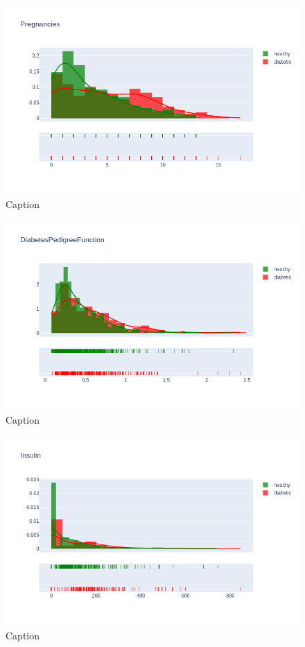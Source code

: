 \documentclass[12pt]{article}
\begin{document}
\begin{figure}[ht]
\centering
\includegraphics[width=1\textwidth]{12.png}
\caption{\label{fig:3} Caption}
\end{figure}

\begin{figure}[ht]
\centering
\includegraphics[width=1\textwidth]{13.png}
\caption{\label{fig:4} Caption}
\end{figure}

\begin{figure}[ht]
\centering
\includegraphics[width=1\textwidth]{14.png}
\caption{\label{fig:5} Caption}
\end{figure}
\end{document}
